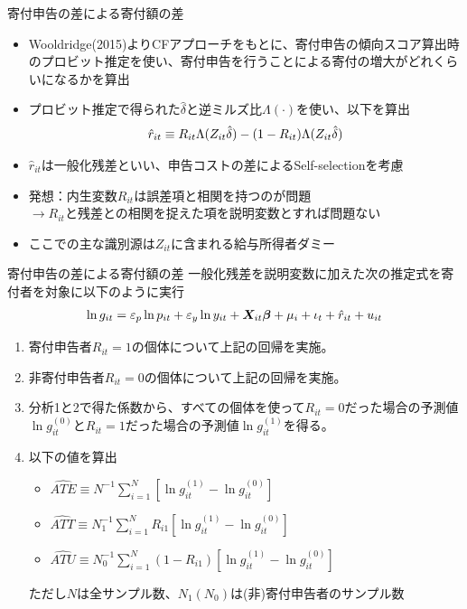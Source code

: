 \documentclass[dvipdfmx,10pt]{beamer}
\begin{document}
\begin{frame}{寄付申告の差による寄付額の差}
	\begin{itemize}
		\item Wooldridge(2015)よりCFアプローチをもとに、寄付申告の傾向スコア算出時のプロビット推定を使い、寄付申告を行うことによる寄付の増大がどれくらいになるかを算出
		\item プロビット推定で得られた$\hat{\delta}$と逆ミルズ比$\Lambda(\cdot)$を使い、以下を算出
		\begin{align}
			\hat{r}_{it}\equiv R_{it}\Lambda(Z_{it}\hat{\delta})-(1-R_{it})\Lambda(Z_{it}\hat{\delta})\notag
		\end{align}
		\item $\hat{r}_{it}$は一般化残差といい、申告コストの差によるSelf-selectionを考慮
		\item 発想：内生変数$R_{it}$は誤差項と相関を持つのが問題\\
		\qquad$\to$$R_{it}$と残差との相関を捉えた項を説明変数とすれば問題ない
		\item ここでの主な識別源は$Z_{it}$に含まれる給与所得者ダミー
	\end{itemize}
\end{frame}


\begin{frame}{寄付申告の差による寄付額の差}
一般化残差を説明変数に加えた次の推定式を寄付者を対象に以下のように実行
		\begin{align}
			\ln g_{it} = \varepsilon_p\ln p_{it}+\varepsilon_y \ln y_{it} + \bm{X}_{it}\bm{\beta} + \mu_i + \iota_t + \hat{r}_{it}+u_{it}\notag
		\end{align}
		\begin{enumerate}
			\item 寄付申告者$R_{it}=1$の個体について上記の回帰を実施。
			\item 非寄付申告者$R_{it}=0$の個体について上記の回帰を実施。
			\item 分析1と2で得た係数から、すべての個体を使って$R_{it}=0$だった場合の予測値$\ln g_{it}^{(0)}$と$R_{it}=1$だった場合の予測値$\ln g_{it}^{(1)}$を得る。
			\item 以下の値を算出
			\begin{itemize}
				\item $\hat{ATE}\equiv N^{-1}\sum_{i=1}^N[\ln g_{it}^{(1)}-\ln g_{it}^{(0)}]$
				\item $\hat{ATT}\equiv N_1^{-1}\sum_{i=1}^NR_{i1}[\ln g_{it}^{(1)}-\ln g_{it}^{(0)}]$
				\item $\hat{ATU}\equiv N_0^{-1}\sum_{i=1}^N(1-R_{i1})[\ln g_{it}^{(1)}-\ln g_{it}^{(0)}]$
			\end{itemize}
			ただし$N$は全サンプル数、$N_1(N_0)$は(非)寄付申告者のサンプル数
		\end{enumerate}
	\end{frame}
\end{document}

